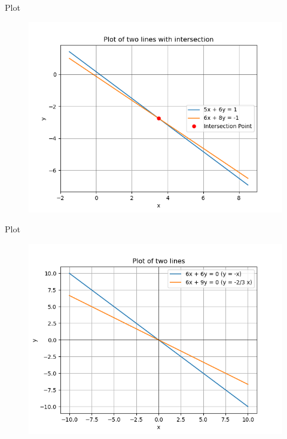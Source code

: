 \documentclass{beamer}
\begin{document}
\begin{frame}{Plot}
    \begin{figure}[H]
    \centering
    \includegraphics[width=0.6\columnwidth]{../figs1/img.png}
    \label{fig:1}
\end{figure}
\end{frame}
\begin{frame}{Plot}
    \begin{figure}[H]
    \centering
    \includegraphics[width=0.6\columnwidth]{../figs2/img.png}
    \label{fig:1}
\end{figure}
\end{frame}
\end{document}
